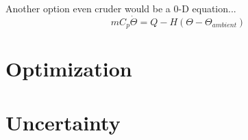 \documentclass[10pt, oneside]{article}   	%
\begin{document}
Another option even cruder would be a 0-D equation...
\begin{equation}
m C_p \dot{\Theta} = Q - H (\Theta - \Theta_{ambient})
\end{equation}

\newpage
\section{Optimization}


\newpage
\section{Uncertainty}
\end{document}
